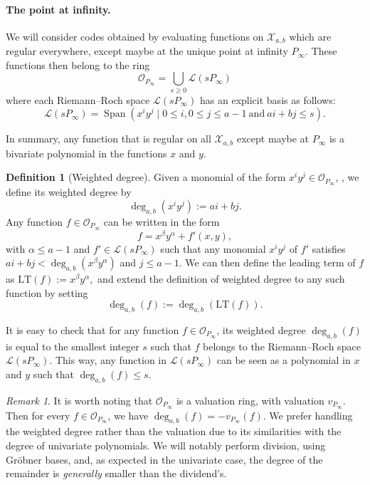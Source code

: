 \documentclass[a4paper]{article}
\theoremstyle{definition}
\newtheorem{definition}[thm]{Definition}
\theoremstyle{remark}
\newtheorem{remark}[thm]{Remark}
\newcommand{\calL}{\mathcal{L}}
\newcommand{\calO}{\mathcal{O}}
\newcommand{\calX}{\mathcal{X}}
\newcommand{\Span}[1]{\operatorname{Span}\left(#1\right)}
\newcommand{\degab}[1]{\deg_{a,b}\left(#1\right)}
\begin{document}
\paragraph{The point at infinity.} We will consider codes obtained by evaluating functions on $\calX_{a,b}$ which are regular everywhere, except maybe at the unique point at infinity $P_\infty$. These functions then belong to the ring 
\begin{equation}\label{eq:O_Pinf}
\mathcal{O}_{P_\infty}=\bigcup_{s \geq 0} \calL(s P_\infty)
\end{equation} %
where each Riemann--Roch space $\calL(s P_\infty)$ has an explicit basis as follows:
\begin{equation} \label{eq:basis_L(sP_inf)}
    \calL(sP_{\infty}) = \Span{x^iy^j \mid 0 \leq i, 0\leq j\leq a-1 \ \mathrm{and} \ ai+bj \leq s}.
\end{equation}

In summary, any function that is regular on all $\calX_{a,b}$ except maybe at $P_\infty$ is a bivariate polynomial in the functions $x$ and $y$. 

\begin{definition}[Weighted degree]
Given a monomial of the form $x^iy^j \in \calO_{P_\infty}$, , we define its weighted degree by
\[ \degab{x^iy^j} := ai+bj.\]
%
Any function $f \in \calO_{P_\infty}$ can be written in the form $$f = x^{\beta}y^{\alpha} + f'(x,y),$$
with $\alpha \leq a-1$ and $f' \in \calL(sP_{\infty})$ such that any monomial $x^iy^j$ of $f'$ satisfies $ai+bj < \degab{x^{\beta}y^{\alpha}}$ and $j \leq a-1$. We can then define the leading term of $f$ as $\mathrm{LT}(f) := x^{\beta}y^{\alpha},$ and extend the definition of weighted degree to any such function by setting 
\[\degab{f} := \degab{\mathrm{LT}(f)}.\]
\end{definition}
It is easy to check that for any function $f \in \calO_{P_\infty}$, its weighted degree $\degab{f}$ is equal to the smallest integer $s$ such that $f$ belongs to the Riemann--Roch space $\calL(sP_{\infty})$.
%
This way, any function in $\calL(sP_\infty)$ can be seen as a polynomial in $x$ and $y$ such that $\degab{f}\leq s$. 
\begin{remark}
It is worth noting that $\calO_{P_\infty}$ is a valuation ring, with valuation $v_{P_\infty}$. Then for every $f \in \calO_{P_\infty}$, we have $\degab{f}=-v_{P_\infty}(f)$. We prefer handling the weighted degree rather than the valuation due to its similarities with the degree of univariate 
polynomials. We will notably perform division, using Gr\"obner bases, and, as expected in the univariate case, the degree of the remainder is 
\textit{generally} smaller than the dividend's.
\end{remark}
\end{document}
